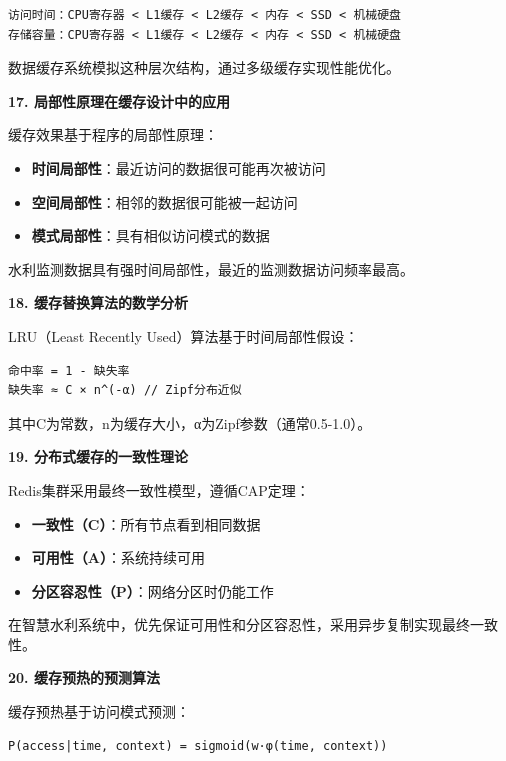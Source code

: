 \begin{lstlisting}
访问时间：CPU寄存器 < L1缓存 < L2缓存 < 内存 < SSD < 机械硬盘
存储容量：CPU寄存器 < L1缓存 < L2缓存 < 内存 < SSD < 机械硬盘
\end{lstlisting}

数据缓存系统模拟这种层次结构，通过多级缓存实现性能优化。

\textbf{17. 局部性原理在缓存设计中的应用}

缓存效果基于程序的局部性原理：

\begin{itemize}
\tightlist
\item
  \textbf{时间局部性}：最近访问的数据很可能再次被访问
\item
  \textbf{空间局部性}：相邻的数据很可能被一起访问
\item
  \textbf{模式局部性}：具有相似访问模式的数据
\end{itemize}

水利监测数据具有强时间局部性，最近的监测数据访问频率最高。

\textbf{18. 缓存替换算法的数学分析}

LRU（Least Recently Used）算法基于时间局部性假设：

\begin{lstlisting}
命中率 = 1 - 缺失率
缺失率 ≈ C × n^(-α) // Zipf分布近似
\end{lstlisting}

其中C为常数，n为缓存大小，α为Zipf参数（通常0.5-1.0）。

\textbf{19. 分布式缓存的一致性理论}

Redis集群采用最终一致性模型，遵循CAP定理：

\begin{itemize}
\tightlist
\item
  \textbf{一致性（C）}：所有节点看到相同数据
\item
  \textbf{可用性（A）}：系统持续可用\\
\item
  \textbf{分区容忍性（P）}：网络分区时仍能工作
\end{itemize}

在智慧水利系统中，优先保证可用性和分区容忍性，采用异步复制实现最终一致性。

\textbf{20. 缓存预热的预测算法}

缓存预热基于访问模式预测：

\begin{lstlisting}
P(access|time, context) = sigmoid(w·φ(time, context))
\end{lstlisting}

